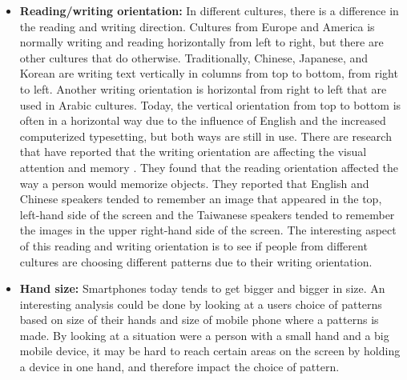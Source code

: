 \begin{itemize}
    \item {\bf Reading/writing orientation:} In different cultures, there is a difference in the reading and writing direction. Cultures from Europe and America is normally writing and reading horizontally from left to right, but there are other cultures that do otherwise. Traditionally, Chinese, Japanese, and Korean are writing text vertically in columns from top to bottom, from right to left. Another writing orientation is horizontal from right to left that are used in Arabic cultures. Today, the vertical orientation from top to bottom is often in a horizontal way due to the influence of English and the increased computerized typesetting, but both ways are still in use. There are research that have reported that the writing orientation are affecting the visual attention and memory \cite{Chan}. They found that the reading orientation affected the way a person would memorize objects. They reported that English and Chinese speakers tended to remember an image that appeared in the top, left-hand side of the screen and the Taiwanese speakers tended to remember the images in the upper right-hand side of the screen. The interesting aspect of this reading and writing orientation is to see if people from different cultures are choosing different patterns due to their writing orientation.
    \item {\bf Hand size:} Smartphones today tends to get bigger and bigger in size. An interesting analysis could be done by looking at a users choice of patterns based on size of their hands and size of mobile phone where a patterns is made. By looking at a situation were a person with a small hand and a big mobile device, it may be hard to reach certain areas on the screen by holding a device in one hand, and therefore impact the choice of pattern. 
  \end{itemize}

